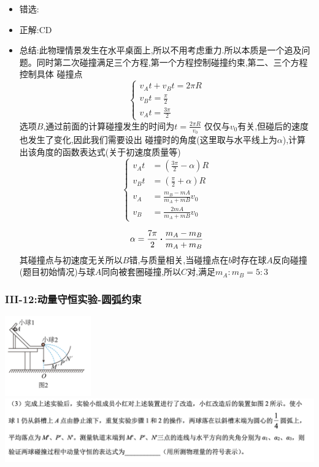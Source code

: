 \documentclass{article}
\begin{document}
\begin{itemize}
    \item 错选:\quad
    \item 正解:\quad CD
    \item 总结:\quad 此物理情景发生在水平桌面上,所以不用考虑重力.所以本质是一个追及问题。同时第二次碰撞满足三个方程,第一个方程控制碰撞约束,第二、三个方程控制具体
          碰撞点
          $$
              \begin{cases}
                  v_{A} t + v_{B} t = 2 \pi R \\
                  v_{B} t  = \frac{\pi}{2}    \\
                  v_{A} t = \frac{3\pi}{2}
              \end{cases}
          $$
          选项$B$,通过前面的计算碰撞发生的时间为$t = \frac{2\pi R}{v_{0}}$ 仅仅与$v_{0}$有关,但碰后的速度也发生了变化,因此我们需要设出
          碰撞时的角度(这里取与水平线上为$\alpha$),计算出该角度的函数表达式(关于初速度质量等)
          $$
              \begin{cases}
                  v_{A} t & = (\frac{3\pi}{2} - \alpha) R           \\
                  v_{B} t & = (\frac{\pi}{2} + \alpha) R            \\
                  v_{A}   & = \frac{m_{B} - m{A}}{m_{A}+m{B}} v_{0} \\
                  v_{B}   & = \frac{2 m{A}}{m_{A}+m{B}} v_{0}
              \end{cases}
          $$

          $$
              \alpha = \frac{7 \pi}{2} \vdot \frac{m_{A} - m_{B}}{m_{A} + m_{B}}
          $$
          其碰撞点与初速度无关所以$B$错,与质量相关,当碰撞点在$b$时存在球$A$反向碰撞(题目初始情况)与球$A$同向被套圈碰撞,所以$C$对,满足$m_{A} : m_{B} = 5 : 3$
\end{itemize}

\vspace{2em}

\subsubsection{III-12:动量守恒实验-圆弧约束}
\includegraphics[width=10em,keepaspectratio]{./pictures/1.2-4.png}
\includegraphics[width=40em,keepaspectratio]{./pictures/1.2-5.png}
\end{document}
